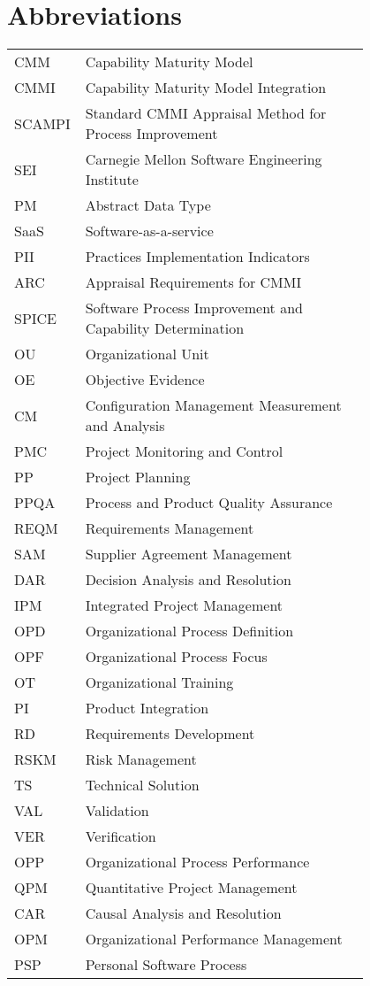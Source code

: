 \chapter*{Abbreviations}

\begin{flushleft}
\begin{tabular}{l p{0.8\linewidth}}
CMM      & Capability Maturity Model\\
CMMI      & Capability Maturity Model Integration\\
SCAMPI      & Standard CMMI Appraisal Method for Process Improvement\\
SEI      & Carnegie Mellon Software Engineering Institute\\
PM      & Abstract Data Type\\
SaaS      & Software-as-a-service\\
PII      & Practices Implementation Indicators\\
ARC & Appraisal Requirements for CMMI\\
SPICE & Software Process Improvement and Capability Determination\\
OU & Organizational Unit\\
OE & Objective Evidence\\
CM & Configuration Management Measurement and Analysis\\
PMC & Project Monitoring and Control\\
PP & Project Planning\\
PPQA & Process and Product Quality Assurance\\
REQM & Requirements Management\\
SAM & Supplier Agreement Management\\
DAR & Decision Analysis and Resolution\\
IPM & Integrated Project Management\\
OPD & Organizational Process Definition\\
OPF & Organizational Process Focus\\
OT & Organizational Training\\
PI & Product Integration\\
RD & Requirements Development\\
RSKM & Risk Management\\
TS & Technical Solution\\
VAL & Validation\\
VER & Verification\\
OPP & Organizational Process Performance\\
QPM & Quantitative Project Management\\
CAR & Causal Analysis and Resolution\\
OPM & Organizational Performance Management\\
PSP & Personal Software Process\\
\end{tabular}
\end{flushleft}

